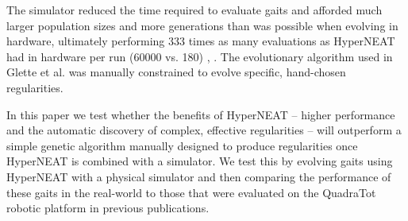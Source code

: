 The simulator reduced the time required to evaluate gaits and afforded much larger population sizes and more generations than was possible when evolving in hardware, ultimately performing 333 times as many evaluations as HyperNEAT had in hardware per run (60000 vs. 180) \cite{yos:clune}, \cite{glette}. 
The evolutionary algorithm used in Glette et al. \cite{glette} was manually constrained to evolve specific, hand-chosen regularities. 

In this paper we test whether the benefits of HyperNEAT -- higher performance and the automatic discovery of complex, effective regularities \cite{clune2,yos:clune} -- will outperform a simple genetic algorithm manually designed to produce regularities once HyperNEAT is combined with a simulator. %
We test this by evolving gaits using HyperNEAT with a physical simulator and then comparing the performance of these gaits in the real-world to those that were evaluated on the QuadraTot robotic platform in previous publications.  %

